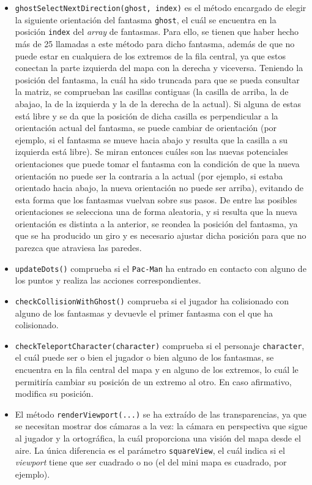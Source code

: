 \documentclass[11pt,a4paper]{article}
\begin{document}
\begin{itemize}
	\item \texttt{ghostSelectNextDirection(ghost, index)} es el método encargado de
	elegir la siguiente orientación del fantasma \texttt{ghost}, el cuál se encuentra en la
	posición \texttt{index} del \textit{array} de fantasmas. Para ello, se tienen que haber
	hecho más de 25 llamadas a este método para dicho fantasma, además de que no puede
	estar en cualquiera de los extremos de la fila central, ya que estos conectan la parte
	izquierda del mapa con la derecha y viceversa. Teniendo la posición del fantasma, la cuál
	ha sido truncada para que se pueda consultar la matriz, se comprueban las casillas
	contiguas (la casilla de arriba, la de abajao, la de la izquierda y la de la derecha de
	la actual). Si alguna de estas está libre y se da que la posición de dicha casilla es
	perpendicular a la orientación actual del fantasma, se puede cambiar de orientación (por
	ejemplo, si el fantasma se mueve hacia abajo y resulta que la casilla a su izquierda
	está libre). Se miran entonces cuáles son las nuevas potenciales orientaciones que puede
	tomar el fantasma con la condición de que la nueva orientación no puede ser la contraria a
	la actual (por ejemplo, si estaba orientado hacia abajo, la nueva orientación no puede ser
	arriba), evitando de esta forma que los fantasmas vuelvan sobre sus pasos. De entre las
	posibles orientaciones se selecciona una de forma aleatoria, y si resulta que la nueva
	orientación es distinta a la anterior, se reondea la posición del fantasma, ya que se ha
	producido un giro y es necesario ajustar dicha posición para que no parezca que atraviesa
	las paredes.
	
	\item \texttt{updateDots()} comprueba si el \texttt{Pac-Man} ha entrado en contacto con
	alguno de los puntos y realiza las acciones correspondientes.
	
	\item \texttt{checkCollisionWithGhost()} comprueba si el jugador ha colisionado con
	alguno de los fantasmas y devuevle el primer fantasma con el que ha colisionado.
	
	\item \texttt{checkTeleportCharacter(character)} comprueba si el personaje \texttt{character},
	el cuál puede ser o bien el jugador o bien alguno de los fantasmas, 	se encuentra en la fila
	central del mapa y en alguno de los extremos, lo cuál le permitiría 	cambiar su posición de
	un extremo al otro. En caso afirmativo, modifica su posición.
	
	\item El método \texttt{renderViewport(...)} se ha extraído de las transparencias, ya que
	se necesitan mostrar dos cámaras a la vez: la cámara en perspectiva que sigue al jugador
	y la ortográfica, la cuál proporciona una visión del mapa desde el aire. La única diferencia
	es el parámetro \texttt{squareView}, el cuál indica si el \textit{viewport} tiene que ser
	cuadrado o no (el del mini mapa es cuadrado, por ejemplo).
\end{itemize}
\end{document}
